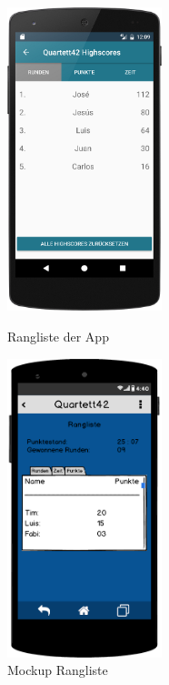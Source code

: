 \begin{figure}[h]
    \centering
    \begin{minipage}{0.49\textwidth}
        \centering
        \includegraphics[width=0.4\textwidth]{img/screenshots/device_high_scores.png}
		\caption{Rangliste der App}
		\label{figure:implementierungrangliste}   
	\end{minipage}
    \begin{minipage}{0.49\textwidth}
        \centering
        \includegraphics[width=0.4\textwidth]{img/mockups/rangliste.png}
        \caption{Mockup Rangliste}
    \end{minipage}
\end{figure}

